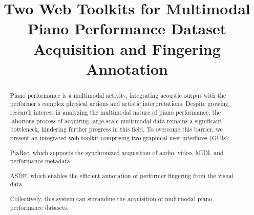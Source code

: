\documentclass{article}
\title{Two Web Toolkits for Multimodal Piano Performance Dataset Acquisition and Fingering Annotation} %
\begin{document}
\maketitle %

\begin{abstract}


Piano performance is a multimodal activity, integrating acoustic output with the performer's complex physical actions and artistic interpretations. Despite growing research interest in analyzing the multimodal nature of piano performance, the laborious process of acquiring large-scale multimodal data remains a significant bottleneck, hindering further progress in this field. To overcome this barrier, we present an integrated web toolkit comprising two graphical user interfaces (GUIs): \begin{inparaenum}[(i)] \item PiaRec, which supports the synchronized acquisition of audio, video, MIDI, and performance metadata. \item ASDF, which enables the efficient annotation of performer fingering from the visual data. \end{inparaenum}Collectively, this system can streamline the acquisition of multimodal piano performance datasets.


\end{abstract}
\end{document}
